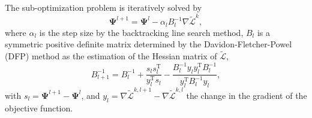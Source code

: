 \documentclass[journal]{IEEEtran}
\renewcommand{\vec}[1]{\mathbf{#1}}
\theoremstyle{definition}
\renewcommand{\vec}[1]{\mathbf{#1}}
\begin{document}
The sub-optimization problem is iteratively solved by
\begin{equation}
  \label{sub_update}
  \vec{\Psi}^{l+1} = \vec{\Psi}^{l} - \alpha_l B^{-1}_l \nabla \tilde{\mathcal{L}}^k,
\end{equation}
where $\alpha_l$ is the step size by the backtracking line search method, $B_l$ is a symmetric positive definite matrix determined by the Davidon-Fletcher-Powel (DFP) method as the estimation of the Hessian matrix of $\tilde{\mathcal{L}}$,
\begin{equation}
  \label{DFP}
  B^{-1}_{l+1} = B^{-1}_l + \frac{ s_l s_l^\text{T}}{y_l^\text{T} s_l} - \frac{B^{-1}_l y_l y_l^\text{T} B^{-1}_l}{y_l^\text{T}B^{-1}_ly_l},
\end{equation}
with $s_l = \vec{\Psi}^{l+1} - \vec{\Psi}^{l}$, and $y_l = \nabla \tilde{\mathcal{L}}^{k,l+1} - \nabla \tilde{\mathcal{L}}^{k,l}$ the change in the gradient of the objective function.




\end{document}
